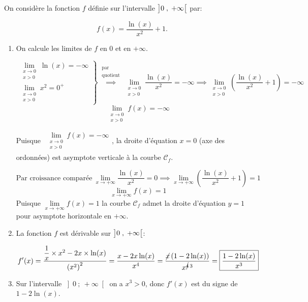 \smallskip

On considère la fonction $f$ définie sur l'intervalle $\left ]0\;,\;+\infty\strut\right [$ par:

\[f(x)=\dfrac{\ln\left (x\right )}{x^2}+1.\]

\begin{enumerate}
	\item On calcule les limites de $f$ en 0 et en $+\infty$.

	\[\left.
	\begin{array}{l}
		\lim\limits_{\substack{x \to 0\\x > 0}}\ln(x) = -\infty\\[8pt]
		\lim\limits_{\substack{x \to 0\\x > 0}}x^{2} = 0^{+}
	\end{array}\right\} \overset{\substack{\text{par}\\\text{quotient}}}{\implies} \lim_{\substack{x \to 0\\x > 0}}\dfrac{\ln(x)}{x^{2}} = -\infty \implies \lim_{\substack{x \to 0\\x > 0}}\left(\dfrac{\ln(x)}{x^{2}} + 1\right) = -\infty\]
	\smallskip
	\[\boxed{\lim_{\substack{x \to 0\\x > 0}}f(x) = -\infty}\]
	\smallskip

	Puisque $\begin{gathered}\lim\limits_{\substack{x \to 0\\x > 0}}f(x) = -\infty\end{gathered}$, la droite d'équation $x = 0$ (axe des ordonnées) est asymptote verticale à la courbe $\mathcal{C}_{f}$.

\medskip

\[\text{Par croissance comparée}\ \lim_{x \to +\infty}\dfrac{\ln(x)}{x^{2}} = 0 \implies \lim_{x \to +\infty}\left(\dfrac{\ln(x)}{x^{2}} + 1\right) = 1\]
\[\boxed{\lim_{x \to +\infty}f(x) = 1}\]
Puisque $\lim\limits_{x \to +\infty}f(x) = 1$ la courbe $\mathcal{C}_{f}$ admet la droite d'équation $y = 1$ pour asymptote horizontale en $+\infty$.

	\item La fonction $f$ est dérivable sur  $\left ]0\;,\;+\infty\strut\right [$:

	\[f'(x) = \dfrac{\dfrac{1}{x}\times x^{2} - 2x \times \ln(x)}{\left(x^{2}\right)^{2}} = \dfrac{x - 2x\ln(x)}{x^{4}} = \dfrac{\cancel{x}\left(1-2\ln(x)\right)}{x^{\cancel{4}\, 3}} = \boxed{\dfrac{1-2\ln(x)}{x^{3}}}\]

	\item Sur l'intervalle \ensuremath{\left]0~;~+\infty\right[} on a $x^{3} > 0$, donc $f'(x)$ est du signe de $1 - 2\ln(x)$.


\end{enumerate}

